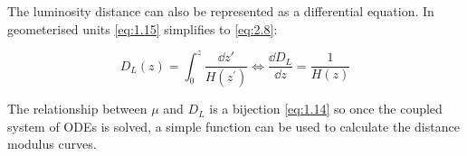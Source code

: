 The luminosity distance can also be represented as a differential equation. In geometerised units \cref{eq:1.15} simplifies to \cref{eq:2.8}:

\begin{equation}
    D_{L} (z)
    = \int_{0}^{z} \frac{\dd{z}\prime{}}{H\left( z^{\prime{}} \right)}
    \iff
    \frac{\dd{D}_{L}}{\dd{z}}
    = \frac{1}{H(z)}
\label{eq:2.8}
\end{equation}

The relationship between $\mu$ and $D_L$ is a bijection \cref{eq:1.14} so once the coupled system of ODEs is solved, a simple function can be used to calculate the distance modulus curves.
